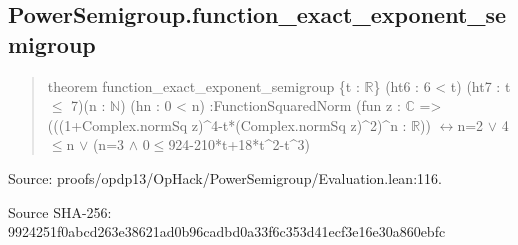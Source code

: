 \documentclass[11pt,a4paper]{article}
\begin{document}
\begin{samepage}
\subsection{PowerSemigroup.function\_exact\_exponent\_semigroup}
\begin{quote}\small\ttfamily theorem function\_exact\_exponent\_semigroup \{t : \ensuremath{\mathbb{R}}\} (ht6 : 6 < t) (ht7 : t \ensuremath{\leq} 7)\newline     (n : \ensuremath{\mathbb{N}}) (hn : 0 < n) :\newline     FunctionSquaredNorm (fun z : \ensuremath{\mathbb{C}} =>\newline       (((1+Complex.normSq z)\textasciicircum{}4-t*(Complex.normSq z)\textasciicircum{}2)\textasciicircum{}n : \ensuremath{\mathbb{R}})) \ensuremath{\leftrightarrow}\newline       n=2 \ensuremath{\vee} 4\ensuremath{\leq}n \ensuremath{\vee} (n=3 \ensuremath{\wedge} 0\ensuremath{\leq}924-210*t+18*t\textasciicircum{}2-t\textasciicircum{}3)\end{quote}
{\small Source: proofs/opdp13/OpHack/PowerSemigroup/Evaluation.lean:116.\par}

{\small Source SHA-256: 9924251f0abcd263e38621ad0b96cadbd0a33f6c353d41ecf3e16e30a860ebfc\par}

\end{samepage}
\end{document}
